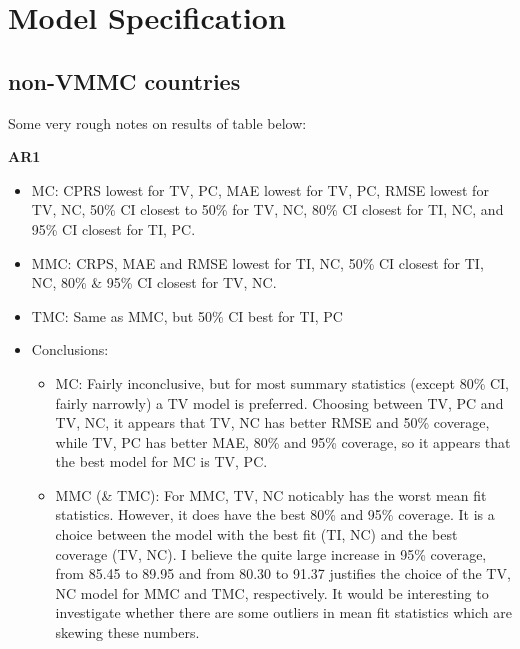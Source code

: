 \documentclass{article}
\begin{document}
\section{Model Specification}
\label{sec:org8802288}

\subsection{non-VMMC countries}
\label{sec:org09db5e8}


Some very rough notes on results of table below:

\textbf{AR1}
\begin{itemize}
    \item MC: CPRS lowest for TV, PC, MAE lowest for TV, PC, RMSE lowest for TV, NC, 50\% CI closest to 50\% for TV, NC, 80\% CI closest for TI, NC, and 95\% CI closest for TI, PC.
    \item MMC: CRPS, MAE and RMSE lowest for TI, NC, 50\% CI closest for TI, NC, 80\% & 95\% CI closest for TV, NC.
    \item TMC: Same as MMC, but 50\% CI best for TI, PC 
    \item Conclusions:
    \begin{itemize}
        \item MC: Fairly inconclusive, but for most summary statistics (except 80\% CI, fairly narrowly) a TV model is preferred. Choosing between TV, PC and TV, NC, %
        it appears that TV, NC has better RMSE and 50\% coverage, while TV, PC has better MAE, 80\% and 95\% coverage, so it appears that the best model for MC is TV, PC.
        \item MMC (\& TMC): 
        For MMC, TV, NC noticably has the worst mean fit statistics. However, it does have the best 80\% and 95\% coverage. It is a choice between the model with the best fit (TI, NC) and the best coverage (TV, NC). I believe the quite large increase in 95\% coverage, from 85.45 to 89.95 and from 80.30 to 91.37 justifies the choice of the TV, NC model for MMC and TMC, respectively. It would be interesting to investigate whether there are some outliers in mean fit statistics which are skewing these numbers. 

\end{itemize}
\end{itemize}
\end{document}
